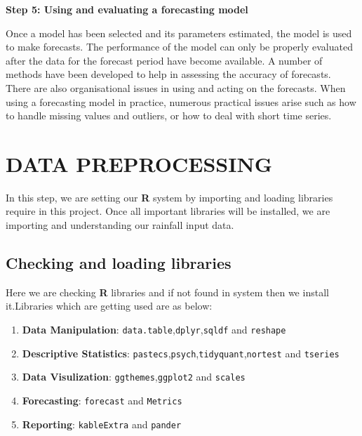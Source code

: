 \documentclass[12pt,openany]{book}
\providecommand{\tightlist}{%
  \setlength{\itemsep}{0pt}\setlength{\parskip}{0pt}}
\begin{document}
\textbf{Step 5: Using and evaluating a forecasting model}

Once a model has been selected and its parameters estimated, the model is used to make forecasts. The performance of the model can only be properly evaluated after the data for the forecast period have become available. A number of methods have been developed to help in assessing the accuracy of forecasts. There are also organisational issues in using and acting on the forecasts. When using a forecasting model in practice, numerous practical issues arise such as how to handle missing values and outliers, or how to deal with short time series.

\hypertarget{data-preprocessing}{%
\chapter{DATA PREPROCESSING}\label{data-preprocessing}}

In this step, we are setting our \textbf{R} system by importing and loading libraries require in this project. Once all important libraries will be installed, we are importing and understanding our rainfall input data.

\hypertarget{checking-and-loading-libraries}{%
\section{Checking and loading libraries}\label{checking-and-loading-libraries}}

Here we are checking \textbf{R} libraries and if not found in system then we install it.Libraries which are getting used are as below:

\begin{enumerate}
\def\labelenumi{\arabic{enumi}.}
\tightlist
\item
  \textbf{Data Manipulation}: \texttt{data.table},\texttt{dplyr},\texttt{sqldf} and \texttt{reshape}
\item
  \textbf{Descriptive Statistics}: \texttt{pastecs},\texttt{psych},\texttt{tidyquant},\texttt{nortest} and \texttt{tseries}
\item
  \textbf{Data Visulization}: \texttt{ggthemes},\texttt{ggplot2} and \texttt{scales}
\item
  \textbf{Forecasting}: \texttt{forecast} and \texttt{Metrics}
\item
  \textbf{Reporting}: \texttt{kableExtra} and \texttt{pander}
\end{enumerate}
\end{document}
